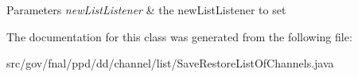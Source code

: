 \begin{DoxyParams}{Parameters}
{\em new\-List\-Listener} & the new\-List\-Listener to set \\
\hline
\end{DoxyParams}


The documentation for this class was generated from the following file\-:\begin{DoxyCompactItemize}
\item 
src/gov/fnal/ppd/dd/channel/list/Save\-Restore\-List\-Of\-Channels.\-java\end{DoxyCompactItemize}
